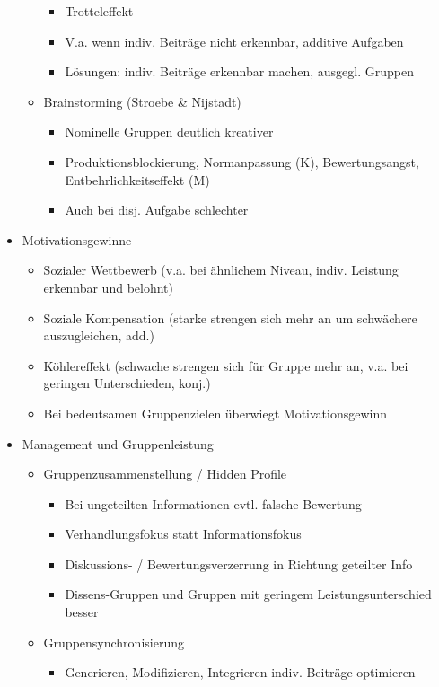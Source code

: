\documentclass[11pt, paper=a4, twocolumn]{scrartcl}
\begin{document}
\begin{itemize}
\begin{itemize}
\begin{itemize}
							\item Trotteleffekt
							\item V.a. wenn indiv. Beiträge nicht erkennbar, additive Aufgaben
							\item Lösungen: indiv. Beiträge erkennbar machen, ausgegl. Gruppen
						\end{itemize}
					\item Brainstorming (Stroebe \& Nijstadt)
						\begin{itemize}
							\item Nominelle Gruppen deutlich kreativer
							\item Produktionsblockierung, Normanpassung (K), Bewertungsangst, Entbehrlichkeitseffekt (M)
							\item Auch bei disj. Aufgabe schlechter
						\end{itemize}
				\end{itemize}
			\item Motivationsgewinne
				\begin{itemize}
					\item Sozialer Wettbewerb (v.a. bei ähnlichem Niveau, indiv. Leistung erkennbar und belohnt)
					\item Soziale Kompensation (starke strengen sich mehr an um schwächere auszugleichen, add.)
					\item Köhlereffekt (schwache strengen sich für Gruppe mehr an, v.a. bei geringen Unterschieden, konj.)
					\item Bei bedeutsamen Gruppenzielen überwiegt Motivationsgewinn
				\end{itemize}
			\item Management und Gruppenleistung
				\begin{itemize}
					\item Gruppenzusammenstellung / Hidden Profile
						\begin{itemize}
							\item Bei ungeteilten Informationen evtl. falsche Bewertung
							\item Verhandlungsfokus statt Informationsfokus
							\item Diskussions- / Bewertungsverzerrung in Richtung geteilter Info
							\item Dissens-Gruppen und Gruppen mit geringem Leistungsunterschied besser
						\end{itemize}
					\item Gruppensynchronisierung
						\begin{itemize}
							\item Generieren, Modifizieren, Integrieren indiv. Beiträge optimieren

\end{itemize}
\end{itemize}
\end{itemize}
\end{document}
